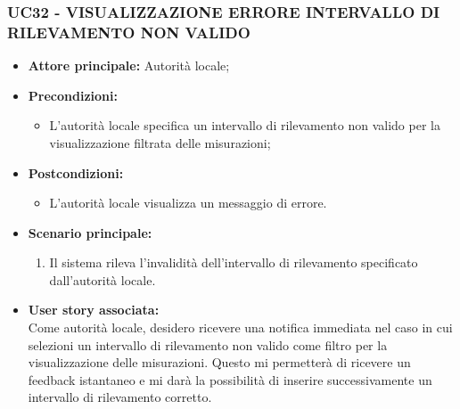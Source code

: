 \subsubsection{UC32 - VISUALIZZAZIONE ERRORE INTERVALLO DI RILEVAMENTO NON VALIDO}
\begin{itemize}
    \item \textbf{Attore principale:} Autorità locale;
    \item \textbf{Precondizioni:}
        \begin{itemize} 
            \item L'autorità locale specifica un intervallo di rilevamento non valido per la visualizzazione filtrata delle misurazioni;
        \end{itemize}
        \item \textbf{Postcondizioni:}
        \begin{itemize}
            \item L'autorità locale visualizza un messaggio di errore.
        \end{itemize}
        \item \textbf{Scenario principale:}
        \begin{enumerate}
            \item Il sistema rileva l'invalidità dell'intervallo di rilevamento specificato dall'autorità locale.
            \end{enumerate}
    \item \textbf{User story associata:} \\
        Come autorità locale, desidero ricevere una notifica immediata nel caso in cui selezioni un intervallo di rilevamento non valido come filtro per la visualizzazione delle misurazioni. Questo mi permetterà di ricevere un feedback istantaneo e mi darà la possibilità di inserire successivamente un intervallo di rilevamento corretto.
\end{itemize}